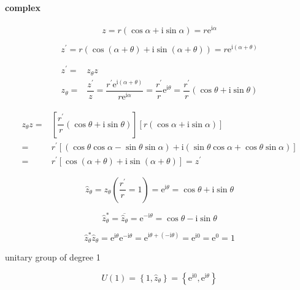 \documentclass[
]{book}
\theoremstyle{definition}
\theoremstyle{definition}
\theoremstyle{definition}
\theoremstyle{definition}
\theoremstyle{remark}
\begin{document}
\hypertarget{complex}{%
\paragraph{complex}\label{complex}}

\[
z=r\left(\cos\alpha+\mathrm{i}\sin\alpha\right)=r\mathrm{e}^{\mathrm{i}\alpha}
\]

\[
z^{\prime}=r\left(\cos\left(\alpha+\theta\right)+\mathrm{i}\sin\left(\alpha+\theta\right)\right)=r\mathrm{e}^{\mathrm{i}\left(\alpha+\theta\right)}
\]

\[
\begin{aligned}
z^{\prime}= & z_{{\scriptscriptstyle \theta}}z\\
z_{{\scriptscriptstyle \theta}}= & \dfrac{z^{\prime}}{z}=\dfrac{r^{\prime}\mathrm{e}^{\mathrm{i}\left(\alpha+\theta\right)}}{r\mathrm{e}^{\mathrm{i}\alpha}}=\dfrac{r^{\prime}}{r}\mathrm{e}^{\mathrm{i}\theta}=\dfrac{r^{\prime}}{r}\left(\cos\theta+\mathrm{i}\sin\theta\right)
\end{aligned}
\]

\[
\begin{aligned}
z_{{\scriptscriptstyle \theta}}z= & \left[\dfrac{r^{\prime}}{r}\left(\cos\theta+\mathrm{i}\sin\theta\right)\right]\left[r\left(\cos\alpha+\mathrm{i}\sin\alpha\right)\right]\\
= & r^{\prime}\left[\left(\cos\theta\cos\alpha-\sin\theta\sin\alpha\right)+\mathrm{i}\left(\sin\theta\cos\alpha+\cos\theta\sin\alpha\right)\right]\\
= & r^{\prime}\left[\cos\left(\alpha+\theta\right)+\mathrm{i}\sin\left(\alpha+\theta\right)\right]=z^{\prime}
\end{aligned}
\]

\[
\hat{z}_{{\scriptscriptstyle \theta}}=z_{{\scriptscriptstyle \theta}}\left(\dfrac{r^{\prime}}{r}=1\right)=\mathrm{e}^{\mathrm{i}\theta}=\cos\theta+\mathrm{i}\sin\theta
\]

\[
\hat{z}_{{\scriptscriptstyle \theta}}^{*}=\overline{\hat{z}_{{\scriptscriptstyle \theta}}}=\mathrm{e}^{-\mathrm{i}\theta}=\cos\theta-\mathrm{i}\sin\theta
\]

\[
\hat{z}_{{\scriptscriptstyle \theta}}^{*}\hat{z}_{{\scriptscriptstyle \theta}}=\mathrm{e}^{\mathrm{i}\theta}\mathrm{e}^{-\mathrm{i}\theta}=\mathrm{e}^{\mathrm{i}\theta+\left(-\mathrm{i}\theta\right)}=\mathrm{e}^{\mathrm{i}0}=\mathrm{e}^{0}=1
\]

unitary group of degree 1

\[
U\left(1\right)=\left\{ 1,\hat{z}_{{\scriptscriptstyle \theta}}\right\} =\left\{ \mathrm{e}^{\mathrm{i}0},\mathrm{e}^{\mathrm{i}\theta}\right\} 
\]
\end{document}
